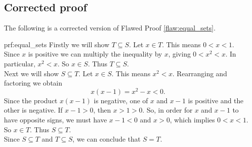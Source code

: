\clearpage
\subsection{Corrected proof}

The following is a corrected version of Flawed Proof \ref{flaw:equal_sets}. 

\begin{prf}{prf:equal_sets}
Firstly we will show $T \subseteq S$. Let $x \in T$. This means $0 < x < 1$. Since $x$ is positive we can multiply the inequality by $x$, giving $0 < x^2 < x$. In particular, $x^2 < x$. So $x \in S$. Thus $T \subseteq S$. \\

Next we will show $S \subseteq T$. Let $x \in S$. This means $x^2 < x$. Rearranging and factoring we obtain 
\[x(x-1) = x^2 -x < 0.\]
 Since the product $x(x-1)$ is negative, one of $x$ and $x-1$ is positive and the other is negative. If $x-1>0$, then $x>1>0$. So, in order for $x$ and $x-1$ to have opposite signs, we must have $x-1<0$ and $x>0$, which implies $0<x<1$. So $x \in T$. Thus $S \subseteq T$. \\

Since $S \subseteq T$ and $T \subseteq S$, we can conclude that $S=T$.
\end{prf} 